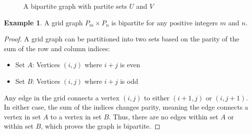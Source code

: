 \documentclass{article}
\theoremstyle{definition}
\newtheorem{example}{Example}
\begin{document}
\begin{figure}[h]
\centering
{}
\caption{A bipartite graph with partite sets $U$ and $V$}
\label{fig:bipartite-uv}
\end{figure}

\pagebreak
\newpage

\begin{example}
    
A grid graph $P_m \times P_n$ is bipartite for any positive integers $m$ and $n$.
\end{example}

\begin{proof}
A grid graph can be partitioned into two sets based on the parity of the sum of the row and column indices:
\begin{itemize}
    \item Set $A$: Vertices $(i,j)$ where $i + j$ is even
    \item Set $B$: Vertices $(i,j)$ where $i + j$ is odd
\end{itemize}

Any edge in the grid connects a vertex $(i,j)$ to either $(i+1,j)$ or $(i,j+1)$. In either case, the sum of the indices changes parity, meaning the edge connects a vertex in set $A$ to a vertex in set $B$. Thus, there are no edges within set $A$ or within set $B$, which proves the graph is bipartite.
\end{proof}
\end{document}
